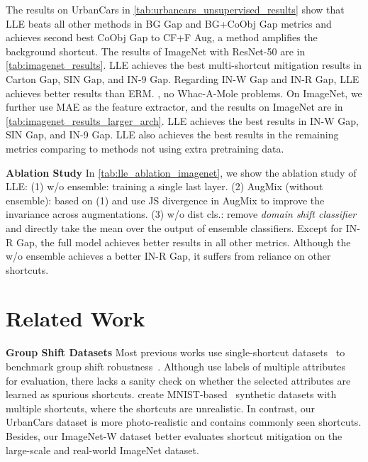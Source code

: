 \documentclass[10pt,twocolumn,letterpaper]{article}
\begin{document}
The results on UrbanCars in \cref{tab:urbancars_unsupervised_results} show that LLE beats all other methods in BG Gap and BG+CoObj Gap metrics and achieves second best CoObj Gap to CF+F Aug, a method amplifies the background shortcut.
The results of ImageNet with ResNet-50 are in \cref{tab:imagenet_results}. LLE achieves the best multi-shortcut mitigation results in Carton Gap, SIN Gap, and IN-9 Gap.
Regarding IN-W Gap and IN-R Gap, LLE achieves better results than ERM. \Ie, no Whac-A-Mole problems.
On ImageNet, we further use MAE as the feature extractor, and the results on ImageNet are in \cref{tab:imagenet_results_larger_arch}.
LLE achieves the best results in IN-W Gap, SIN Gap, and IN-9 Gap. LLE also achieves the best results in the remaining metrics comparing to methods not using extra pretraining data.

\noindent \textbf{Ablation Study} \quad In \cref{tab:lle_ablation_imagenet}, we show the ablation study of LLE: (1) w/o ensemble: training a single last layer. (2) AugMix (without ensemble): based on (1) and use JS divergence in AugMix to improve the invariance across augmentations. (3) w/o dist cls.: remove \textit{domain shift classifier} and directly take the mean over the output of ensemble classifiers. Except for IN-R Gap, the full model achieves better results in all other metrics. Although the w/o ensemble achieves a better IN-R Gap, it suffers from reliance on other shortcuts.



\section{Related Work}

\noindent \textbf{Group Shift Datasets} \quad
Most previous works use single-shortcut datasets~\cite{sagawa2020Int.Conf.Learn.Represent.Distributionally,arjovsky2020Invariant,nam2020Adv.NeuralInf.Process.Syst.Learning,kim2021IEEECVFInt.Conf.Comput.Vis.ICCVBiaSwap,liu2015IEEEInt.Conf.Comput.Vis.ICCVDeep,liang2022Int.Conf.Learn.Represent.MetaShift,he2021PatternRecognitionNonI,koh2021Proc.38thInt.Conf.Mach.Learn.WILDS} to benchmark group shift robustness~\cite{sagawa2020Int.Conf.Learn.Represent.Distributionally}.
Although \cite{seo2022IEEECVFConf.Comput.Vis.PatternRecognit.CVPRUnsupervised,bao2021Int.Conf.Mach.Learn.Predict,zhao2022Submitt.Int.Conf.Learn.Represent.Scaling} use labels of multiple attributes~\cite{liu2015IEEEInt.Conf.Comput.Vis.ICCVDeep} for evaluation, there lacks a sanity check on whether the selected attributes are learned as spurious shortcuts.
\cite{shrestha2022IEEECVFWinterConf.Appl.Comput.Vis.WACVInvestigation,li2022Eur.Conf.Comput.Vis.ECCVDiscovera} create MNIST-based~\cite{lecun1998Proc.IEEEGradientbased} synthetic datasets with multiple shortcuts, where the shortcuts are unrealistic.
In contrast, our UrbanCars dataset is more photo-realistic and contains commonly seen shortcuts.
Besides, our ImageNet-W dataset better evaluates shortcut mitigation on the large-scale and real-world ImageNet dataset.
\end{document}
